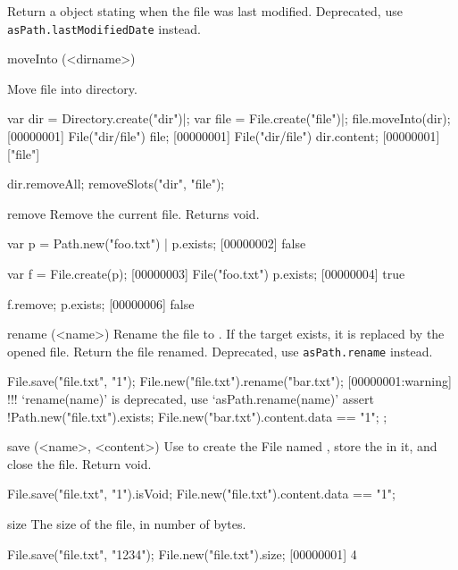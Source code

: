\begin{urbiscriptapi}
  Return a  object stating when the file was last modified.
  Deprecated, use \lstinline|asPath.lastModifiedDate| instead.


\item[moveInto](<dirname>)
  \experimental{}

  Move file into  directory.
\begin{urbiscript}
var dir = Directory.create("dir")|;
var file = File.create("file")|;
file.moveInto(dir);
[00000001] File("dir/file")
file;
[00000001] File("dir/file")
dir.content;
[00000001] ["file"]
\end{urbiscript}
\begin{urbicomment}
dir.removeAll;
removeSlots("dir", "file");
\end{urbicomment}


\item[remove]
  Remove the current file.  Returns void.
\begin{urbiscript}[firstnumber=1]
var p = Path.new("foo.txt") |
p.exists;
[00000002] false

var f = File.create(p);
[00000003] File("foo.txt")
p.exists;
[00000004] true

f.remove;
p.exists;
[00000006] false
\end{urbiscript}


\item[rename](<name>)%
  Rename the file to .  If the target exists, it is replaced by
  the opened file. Return the file renamed.
  Deprecated, use \lstinline|asPath.rename| instead.
\begin{urbiscript}
File.save("file.txt", "1\n");
File.new("file.txt").rename("bar.txt");
[00000001:warning] !!! `rename(name)' is deprecated, use `asPath.rename(name)'
assert
{
  !Path.new("file.txt").exists;
  File.new("bar.txt").content.data == "1\n";
};
\end{urbiscript}


\item[save](<name>, <content>)
  Use  to create the File named , store the
   in it, and close the file.  Return void.
\begin{urbiassert}
File.save("file.txt", "1\n").isVoid;
File.new("file.txt").content.data == "1\n";
\end{urbiassert}


\item[size]
  The size of the file, in number of bytes.
\begin{urbiscript}
File.save("file.txt", "1234");
File.new("file.txt").size;
[00000001] 4
\end{urbiscript}
\end{urbiscriptapi}


